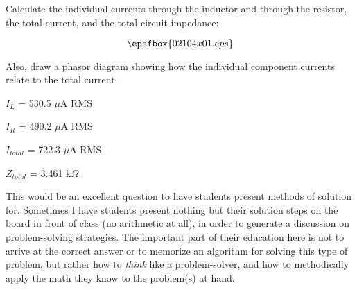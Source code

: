 

Calculate the individual currents through the inductor and through the resistor, the total current, and the total circuit impedance:

$$\epsfbox{02104x01.eps}$$

Also, draw a phasor diagram showing how the individual component currents relate to the total current.







$I_L$ = 530.5 $\mu$A RMS

$I_R$ = 490.2 $\mu$A RMS

$I_{total}$ = 722.3 $\mu$A RMS

$Z_{total}$ = 3.461 k$\Omega$







This would be an excellent question to have students present methods of solution for.  Sometimes I have students present nothing but their solution steps on the board in front of class (no arithmetic at all), in order to generate a discussion on problem-solving strategies.  The important part of their education here is not to arrive at the correct answer or to memorize an algorithm for solving this type of problem, but rather how to {\it think} like a problem-solver, and how to methodically apply the math they know to the problem(s) at hand.




